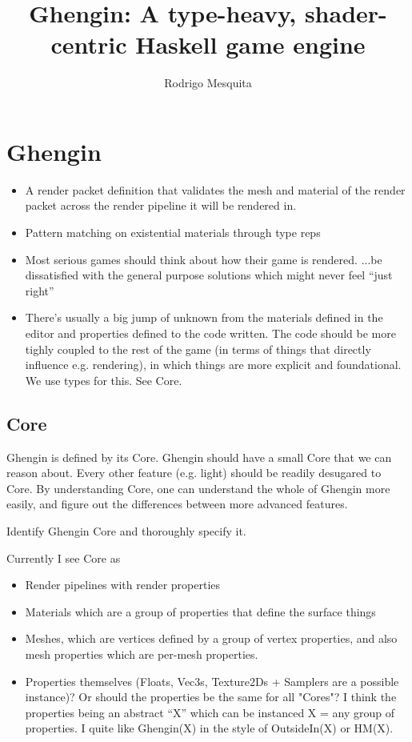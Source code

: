 \documentclass[a4paper,twoside,onecolumn,openright]{memoir}
\title{Ghengin: A type-heavy, shader-centric Haskell game engine}
\author{Rodrigo Mesquita}
\begin{document}
\maketitle

\chapter{Ghengin}

\begin{itemize}
  \item A render packet definition that validates the mesh and material of the
    render packet across the render pipeline it will be rendered in.
  \item Pattern matching on existential materials through type reps
  \item Most serious games should think about how their game is rendered. ...be
      dissatisfied with the general purpose solutions which might never feel
        ``just right''
  \item There's usually a big jump of unknown from the materials defined in the
      editor and properties defined to the code written. The code should be
        more tighly coupled to the rest of the game (in terms of things that
        directly influence e.g. rendering), in which things are more explicit
        and foundational. We use types for this. See Core.
\end{itemize}

\section{Core}

Ghengin is defined by its Core.
Ghengin should have a small Core that we can reason about.
Every other feature (e.g. light) should be readily desugared to Core.
By understanding Core, one can understand the whole of Ghengin more easily, and figure out the differences between more advanced features.

Identify Ghengin Core and thoroughly specify it.

Currently I see Core as
\begin{itemize}
    \item Render pipelines with render properties
    \item Materials which are a group of properties that define the surface
        things
    \item Meshes, which are vertices defined by a group of vertex properties,
        and also mesh properties which are per-mesh properties.
    \item Properties themselves (Floats, Vec3s, Texture2Ds + Samplers are a
        possible instance)? Or should the properties be the same for all
        "Cores"? I think the properties being an abstract ``X'' which can be
        instanced X = any group of properties. I quite like Ghengin(X) in the
        style of OutsideIn(X) or HM(X).
\end{itemize}
\end{document}
